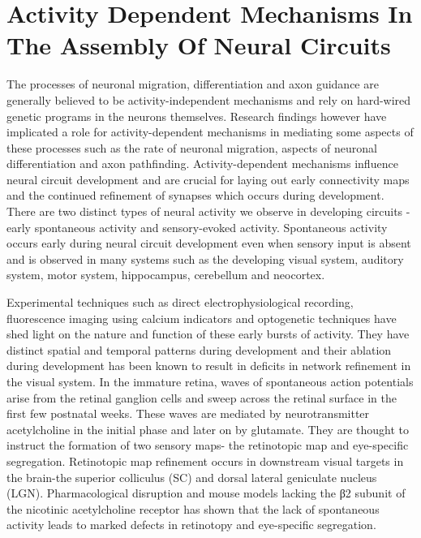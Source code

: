 \documentclass[]{book}
\begin{document}
\hypertarget{activity-dependent-mechanisms-in-the-assembly-of-neural-circuits}{%
\section{Activity Dependent Mechanisms In The Assembly Of Neural Circuits}\label{activity-dependent-mechanisms-in-the-assembly-of-neural-circuits}}

The processes of neuronal migration, differentiation and axon guidance are generally believed to be activity-independent mechanisms and rely on hard-wired genetic programs in the neurons themselves. Research findings however have implicated a role for activity-dependent mechanisms in mediating some aspects of these processes such as the rate of neuronal migration, aspects of neuronal differentiation and axon pathfinding. Activity-dependent mechanisms influence neural circuit development and are crucial for laying out early connectivity maps and the continued refinement of synapses which occurs during development. There are two distinct types of neural activity we observe in developing circuits -early spontaneous activity and sensory-evoked activity. Spontaneous activity occurs early during neural circuit development even when sensory input is absent and is observed in many systems such as the developing visual system, auditory system, motor system, hippocampus, cerebellum and neocortex.

Experimental techniques such as direct electrophysiological recording, fluorescence imaging using calcium indicators and optogenetic techniques have shed light on the nature and function of these early bursts of activity. They have distinct spatial and temporal patterns during development and their ablation during development has been known to result in deficits in network refinement in the visual system. In the immature retina, waves of spontaneous action potentials arise from the retinal ganglion cells and sweep across the retinal surface in the first few postnatal weeks. These waves are mediated by neurotransmitter acetylcholine in the initial phase and later on by glutamate. They are thought to instruct the formation of two sensory maps- the retinotopic map and eye-specific segregation. Retinotopic map refinement occurs in downstream visual targets in the brain-the superior colliculus (SC) and dorsal lateral geniculate nucleus (LGN). Pharmacological disruption and mouse models lacking the β2 subunit of the nicotinic acetylcholine receptor has shown that the lack of spontaneous activity leads to marked defects in retinotopy and eye-specific segregation.
\end{document}
